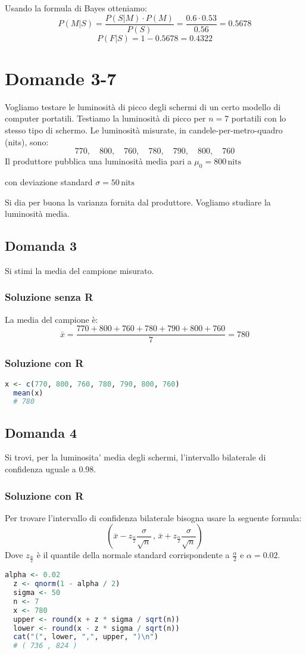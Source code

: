 \documentclass[a4paper]{article}
\theoremstyle{break}
\theoremstyle{break}
\theoremstyle{break}
\theoremstyle{break}
\begin{document}
Usando la formula di Bayes otteniamo:
\[
P(M|S) = \frac{P(S|M) \cdot P(M)}{P(S)} = \frac{0.6 \cdot 0.53}{0.56} = 0.5678
\] 
\[
P(F|S) = 1 - 0.5678 = 0.4322
\] 

\section{Domande 3-7}
Vogliamo testare le luminosità di picco degli schermi di un
certo modello di computer portatili. Testiamo la luminosità di 
picco per \( n = 7 \)  portatili con lo stesso tipo di schermo.
Le luminosità misurate, in candele-per-metro-quadro (nits), sono:
\[
770, \quad 800, \quad 760, \quad 780, \quad 790, \quad 800, \quad 760
\] 
Il produttore pubblica una luminosità media pari a \( \mu_0 = 800\,\text{nits} \) 

\noindent con deviazione standard \( \sigma = 50\,\text{nits} \) 

\vspace{1em}
\noindent Si dia per buona la varianza fornita dal produttore.
Vogliamo studiare la luminosità media.

\subsection{Domanda 3}
Si stimi la media del campione misurato.

\subsubsection{Soluzione senza R}
La media del campione è:
\[
  \bar{x} = \frac{770 + 800 + 760 + 780 + 790 + 800 + 760}{7} = 780
\] 
\subsubsection{Soluzione con R}
\begin{lstlisting}[language=R]
  x <- c(770, 800, 760, 780, 790, 800, 760)
  mean(x)
  # 780
\end{lstlisting}

\subsection{Domanda 4}
Si trovi, per la luminosita' media degli schermi, l'intervallo 
bilaterale di confidenza uguale a 0.98.

\subsubsection{Soluzione con R}
Per trovare l'intervallo di confidenza bilaterale bisogna usare
la seguente formula:
\[
  \left( \bar{x} - z_{\frac{\alpha}{2}} \frac{\sigma}{\sqrt{n}} \,,\,
    \bar{x} + z_{\frac{\alpha}{2}} \frac{\sigma}{\sqrt{n}}
  \right) 
\] 
Dove \( z_{\frac{\alpha}{2}} \) è il quantile della normale standard
corrispondente a \( \frac{\alpha}{2} \) e \( \alpha = 0.02 \).
\begin{lstlisting}[language=R]
  alpha <- 0.02
  z <- qnorm(1 - alpha / 2)
  sigma <- 50
  n <- 7
  x <- 780
  upper <- round(x + z * sigma / sqrt(n))
  lower <- round(x - z * sigma / sqrt(n))
  cat("(", lower, ",", upper, ")\n")
  # ( 736 , 824 )
\end{lstlisting}
\end{document}
